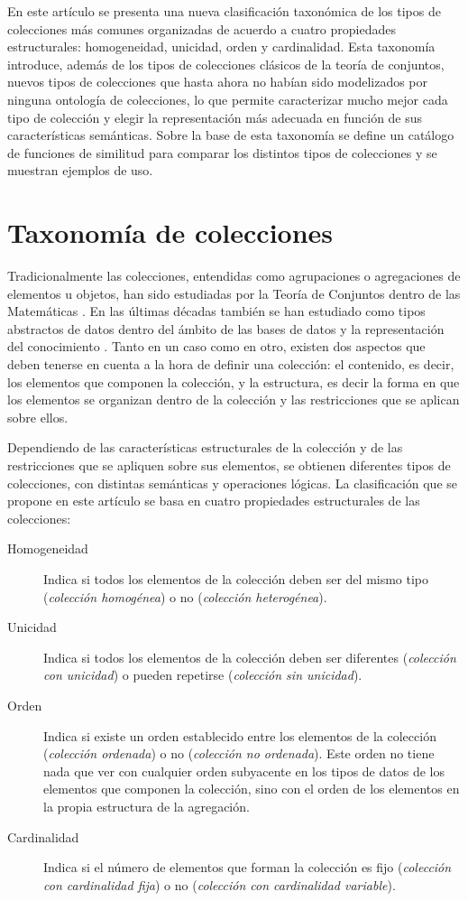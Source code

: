\documentclass[a4paper,10pt,twoside]{article}
\theoremstyle{definition}
\begin{document}
En este artículo se presenta una nueva clasificación taxonómica de los tipos de colecciones más comunes organizadas de acuerdo a cuatro propiedades estructurales: homogeneidad, unicidad, orden y cardinalidad.
Esta taxonomía introduce, además de los tipos de colecciones clásicos de la teoría de conjuntos, nuevos tipos de colecciones que hasta ahora no habían sido modelizados por ninguna ontología de colecciones, lo que permite caracterizar mucho mejor cada tipo de colección y elegir la representación más adecuada en función de sus características semánticas. 
Sobre la base de esta taxonomía se define un catálogo de funciones de similitud para comparar los distintos tipos de colecciones y se muestran ejemplos de uso.


\section{Taxonomía de colecciones}\label{sec:taxonomia-colecciones}
Tradicionalmente las colecciones, entendidas como agrupaciones o agregaciones de elementos u objetos, han sido estudiadas por
la Teoría de Conjuntos dentro de las Matemáticas \cite{foreman2006handbook,aigner1979combinatorial,blizard1989multiset}.
En las últimas décadas también se han estudiado como tipos abstractos de datos dentro del ámbito de las bases de datos y la
representación del conocimiento \cite{kent1988semantics,kent1993carriers,hartmann2007collection}.
Tanto en un caso como en otro, existen dos aspectos que deben tenerse en cuenta a la hora de definir una colección: el contenido,
es decir, los elementos que componen la colección, y la estructura, es decir la forma en que los elementos se organizan dentro de
la colección y las restricciones que se aplican sobre ellos. 

Dependiendo de las características estructurales de la colección y de las restricciones que se apliquen
sobre sus elementos, se obtienen diferentes tipos de colecciones, con distintas semánticas y operaciones lógicas.   
La clasificación que se propone en este artículo se basa en cuatro propiedades estructurales de las colecciones: 
\begin{description}
\item[Homogeneidad] Indica si todos los elementos de la colección deben ser del mismo tipo (\emph{colección homogénea}) o no
(\emph{colección heterogénea}).
\item[Unicidad] Indica si todos los elementos de la colección deben ser diferentes (\emph{colección con unicidad}) o pueden
repetirse (\emph{colección sin unicidad}).
\item[Orden] Indica si existe un orden establecido entre los elementos de la colección (\emph{colección ordenada}) o no
(\emph{colección no ordenada}).
Este orden no tiene nada que ver con cualquier orden subyacente en los tipos de datos de los elementos que componen la colección,
sino con el orden de los elementos en la propia estructura de la agregación.
\item[Cardinalidad] Indica si el número de elementos que forman la colección es fijo (\emph{colección con cardinalidad fija}) o
no (\emph{colección con cardinalidad variable}).
\end{description}
\end{document}
